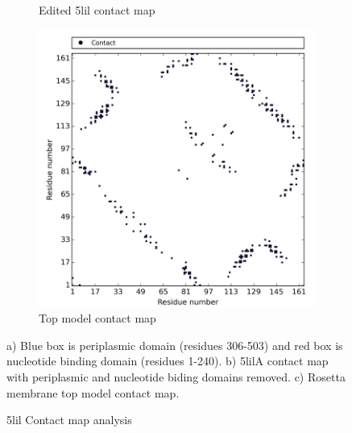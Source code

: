 \begin{figure}[htb]
\begin{subfigure}{0.25\textwidth}
  \caption{Edited 5lil contact map}
  \label{fig:1}
\end{subfigure}\hfil %
\begin{subfigure}{0.25\textwidth}
  \includegraphics[width=\linewidth]{Results/5lil_topmodel.png}
  \caption{Top model contact map}
  \label{fig:2}
\end{subfigure}
\caption{5lil Contact map analysis}
\small
a) Blue box is periplasmic domain (residues 306-503) and red box is nucleotide binding domain (residues 1-240). b) 5lilA contact map with periplasmic and nucleotide biding domains removed. c) Rosetta membrane top model contact map.
\label{fig:5lil_cmaps}
\end{figure}

